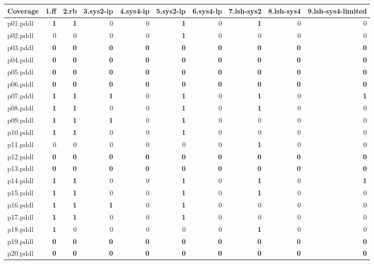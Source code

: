 \documentclass{article}
\begin{document}
\begin{tabular}{@{}lrrrrrrrrr@{}}
Coverage & 1.ff & 2.rb & 3.sys2-ip & 4.sys4-ip & 5.sys2-lp & 6.sys4-lp & 7.lsh-sys2 & 8.lsh-sys4 & 9.lsh-sys4-limited \\
\midrule
p01.pddl & \textbf{1} & \textbf{1} & 0 & 0 & \textbf{1} & 0 & \textbf{1} & 0 & 0 \\
p02.pddl & 0 & 0 & 0 & 0 & \textbf{1} & 0 & 0 & 0 & 0 \\
p03.pddl & \textbf{0} & \textbf{0} & \textbf{0} & \textbf{0} & \textbf{0} & \textbf{0} & \textbf{0} & \textbf{0} & \textbf{0} \\
p04.pddl & \textbf{0} & \textbf{0} & \textbf{0} & \textbf{0} & \textbf{0} & \textbf{0} & \textbf{0} & \textbf{0} & \textbf{0} \\
p05.pddl & \textbf{0} & \textbf{0} & \textbf{0} & \textbf{0} & \textbf{0} & \textbf{0} & \textbf{0} & \textbf{0} & \textbf{0} \\
p06.pddl & \textbf{0} & \textbf{0} & \textbf{0} & \textbf{0} & \textbf{0} & \textbf{0} & \textbf{0} & \textbf{0} & \textbf{0} \\
p07.pddl & \textbf{1} & \textbf{1} & \textbf{1} & 0 & \textbf{1} & 0 & \textbf{1} & 0 & \textbf{1} \\
p08.pddl & \textbf{1} & \textbf{1} & 0 & 0 & \textbf{1} & 0 & \textbf{1} & 0 & 0 \\
p09.pddl & \textbf{1} & \textbf{1} & \textbf{1} & 0 & \textbf{1} & 0 & 0 & 0 & 0 \\
p10.pddl & \textbf{1} & \textbf{1} & 0 & 0 & \textbf{1} & 0 & 0 & 0 & 0 \\
p11.pddl & 0 & 0 & 0 & 0 & 0 & 0 & \textbf{1} & 0 & 0 \\
p12.pddl & \textbf{0} & \textbf{0} & \textbf{0} & \textbf{0} & \textbf{0} & \textbf{0} & \textbf{0} & \textbf{0} & \textbf{0} \\
p13.pddl & \textbf{0} & \textbf{0} & \textbf{0} & \textbf{0} & \textbf{0} & \textbf{0} & \textbf{0} & \textbf{0} & \textbf{0} \\
p14.pddl & \textbf{1} & \textbf{1} & 0 & 0 & \textbf{1} & 0 & \textbf{1} & 0 & \textbf{1} \\
p15.pddl & \textbf{1} & \textbf{1} & 0 & 0 & \textbf{1} & 0 & \textbf{1} & 0 & 0 \\
p16.pddl & \textbf{1} & \textbf{1} & \textbf{1} & 0 & \textbf{1} & 0 & 0 & 0 & 0 \\
p17.pddl & \textbf{1} & \textbf{1} & 0 & 0 & \textbf{1} & 0 & 0 & 0 & 0 \\
p18.pddl & \textbf{1} & 0 & 0 & 0 & 0 & 0 & \textbf{1} & 0 & 0 \\
p19.pddl & \textbf{0} & \textbf{0} & \textbf{0} & \textbf{0} & \textbf{0} & \textbf{0} & \textbf{0} & \textbf{0} & \textbf{0} \\
p20.pddl & \textbf{0} & \textbf{0} & \textbf{0} & \textbf{0} & \textbf{0} & \textbf{0} & \textbf{0} & \textbf{0} & \textbf{0} \\
\end{tabular}
\end{document}
